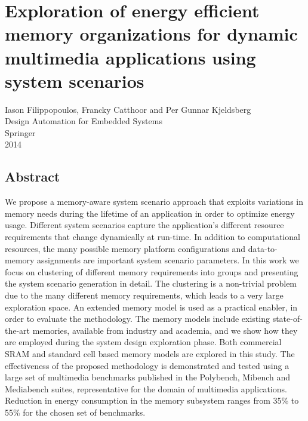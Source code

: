 \chapter{Exploration of energy efficient memory organizations for dynamic multimedia applications using system scenarios}

\begin{center}
Iason Filippopoulos, Francky Catthoor and Per Gunnar Kjeldsberg
\\
Design Automation for Embedded Systems
\\
Springer
\\
2014
\end{center}
\afterpage{\null\newpage}
\newpage

\vspace*{\fill}
\section*{\hspace*{\fill} Abstract \hspace*{\fill}}
We propose a memory-aware system scenario approach that exploits variations in memory needs during the lifetime of an application in order to optimize energy usage. 
Different system scenarios capture the application's different resource requirements that change dynamically at run-time. 
In addition to computational resources, the many possible memory platform configurations and data-to-memory assignments are important system scenario parameters. 
In this work we focus on clustering of different memory requirements into groups and presenting the system scenario generation in detail.
The clustering is a non-trivial problem due to the many different memory requirements, which leads to a very large exploration space.
An extended memory model is used as a practical enabler, in order to evaluate the methodology. 
The memory models include existing state-of-the-art memories, available from industry and academia, and we show how they are employed during the system design exploration phase. 
Both commercial SRAM and standard cell based memory models are explored in this study. 
The effectiveness of the proposed methodology is demonstrated and tested using a large set of multimedia benchmarks published in the Polybench, Mibench and Mediabench suites,
representative for the domain of multimedia applications.
Reduction in energy consumption in the memory subsystem ranges from 35\% to 55\% for the chosen set of benchmarks.
\vspace*{\fill}
\afterpage{\null\newpage}
\newpage

